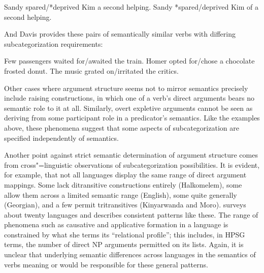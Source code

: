 \documentclass[output=paper
                ,modfonts
                ,nonflat
	        ,collection
	        ,collectionchapter
	        ,collectiontoclongg
 	        ,biblatex
                ,babelshorthands
                ,newtxmath
                ,draftmode
                ,colorlinks, citecolor=brown
]{./langsci/langscibook}
\begin{document}
\begin{exe}
\ex \label{ps-subcat-ex}
\begin{xlist}
\ex    Sandy spared/*deprived Kim a second helping.
\ex    Sandy *spared/deprived Kim of a second helping.
\citep[ex.\ 214--215]{pollard+sag:1987}
\end{xlist}
\end{exe}

\noindent
And Davis provides these pairs of semantically similar verbs with differing subcategorization requirements:

\begin{exe}
\ex \label{ard-subcat-ex}
\begin{xlist}
\ex    Few passengers waited for/awaited the train.
\ex    Homer opted for/chose a chocolate frosted donut.
\ex    The music grated on/irritated the critics.
\citep[ex.\ 5.4]{Davis2001}
\end{xlist}
\end{exe}

Other cases where argument structure seems not to mirror semantics precisely include raising constructions, in which one of a verb's direct arguments bears no semantic role to it at all.
Similarly, overt expletive arguments cannot be seen as deriving from some participant role in a predicator's semantics.
Like the examples above, these phenomena suggest that some aspects of subcategorization are specified independently of semantics.

Another point against strict semantic determination of argument structure comes from cross"=linguistic observations of subcategorization possibilities.
It is evident, for example, that not all languages display the same range of direct argument mappings.
Some lack ditransitive  constructions entirely (Halkomelem), some allow them across a limited semantic range (English), some quite generally (Georgian), and a few permit tritransitives (Kinyarwanda and Moro).
\citet{Gerdts1992} surveys about twenty languages and describes consistent patterns like these.
The range of phenomena such as causative and applicative formation in a language is constrained by what she terms its ``relational profile''; this includes, in HPSG terms, the number of direct NP arguments permitted on its \argst lists.
Again, it is unclear that underlying semantic differences across languages in the semantics of verbs meaning  or  would be responsible for these general patterns.
\end{document}

